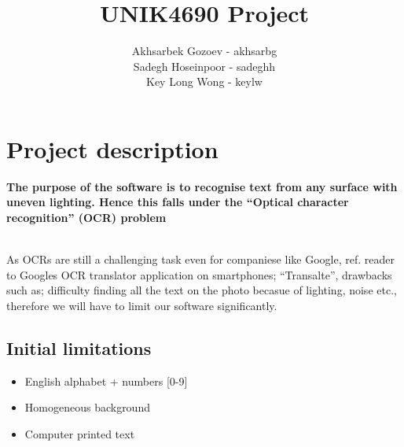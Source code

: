\documentclass[11pt,a4paper,english]{article}
\title{UNIK4690 Project}
\author{
  Akhsarbek Gozoev  - akhsarbg \\
  Sadegh Hoseinpoor - sadeghh\\
  Key Long Wong - keylw
}
\begin{document}
\maketitle
\section{Project description}
\textbf{The purpose of the software is to recognise text from any
surface with uneven lighting. Hence this falls under the ``Optical character recognition'' (OCR) problem}

\noindent \\ As OCRs are still a challenging task even for companiese like
Google, ref. reader to Googles OCR translator application on smartphones;
``Transalte'', drawbacks such as; difficulty finding all the text on the photo
becasue of lighting, noise etc., therefore we will have to limit our software
significantly.

\subsection{Initial limitations}
\begin{itemize}
 \item{English alphabet + numbers [0-9]}
 \item{Homogeneous background}
 \item{Computer printed text}
\end{itemize}
\end{document}
